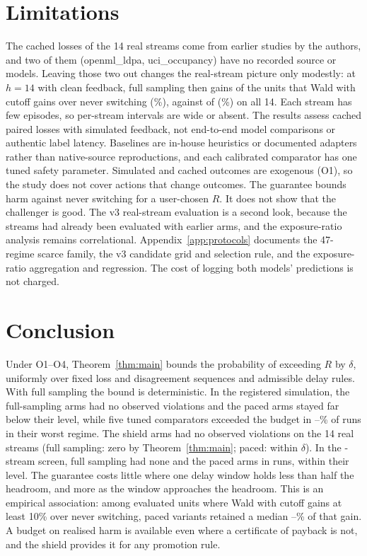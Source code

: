 \documentclass[10pt]{article}
\theoremstyle{plain}
\theoremstyle{definition}
\begin{document}
\section{Limitations}\label{sec:limits}
The cached losses of the 14 real streams come from earlier studies by the authors, and two of them (openml\_ldpa, uci\_occupancy) have no recorded source or models. Leaving those two out changes the real-stream picture only modestly: at $h=14$ with clean feedback, full sampling then gains \SensPiVsNeverFourteen{} of the \SensWaldGain{} units that Wald with cutoff gains over never switching (\SensPiShareFourteen\%), against \RealPiVsNeverCleanHfourteen{} of \RealWaldGain{} (\RealPiShareFourteen\%) on all 14. Each stream has few episodes, so per-stream intervals are wide or absent. The results assess cached paired losses with simulated feedback, not end-to-end model comparisons or authentic label latency. Baselines are in-house heuristics or documented adapters rather than native-source reproductions, and each calibrated comparator has one tuned safety parameter. Simulated and cached outcomes are exogenous (O1), so the study does not cover actions that change outcomes. The guarantee bounds harm against never switching for a user-chosen $R$. It does not show that the challenger is good. The v3 real-stream evaluation is a second look, because the streams had already been evaluated with earlier arms, and the exposure-ratio analysis remains correlational. Appendix~\ref{app:protocols} documents the 47-regime scarce family, the v3 candidate grid and selection rule, and the exposure-ratio aggregation and regression. The cost of logging both models' predictions is not charged.

\section{Conclusion}
Under O1--O4, Theorem~\ref{thm:main} bounds the probability of exceeding $R$ by $\delta$, uniformly over fixed loss and disagreement sequences and admissible delay rules. With full sampling the bound is deterministic. In the registered simulation, the full-sampling arms had no observed violations and the paced arms stayed far below their level, while five tuned comparators exceeded the budget in \CThreeMinWorst--\CThreeMaxWorst\% of runs in their worst regime. The shield arms had no observed violations on the 14 real streams (full sampling: zero by Theorem~\ref{thm:main}; paced: within $\delta$). In the \ScreenPool-stream screen, full sampling had none and the paced arms \ScreenPacedViol{} in \ScreenRunsPerArm{} runs, within their level. The guarantee costs little where one delay window holds less than half the headroom, and more as the window approaches the headroom. This is an empirical association: among evaluated units where Wald with cutoff gains at least 10\% over never switching, paced variants retained a median \KeepLo--\KeepHi\% of that gain. A budget on realised harm is available even where a certificate of payback is not, and the shield provides it for any promotion rule.
\end{document}
